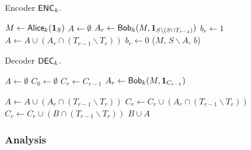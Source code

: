 \begin{algorithm}[H] 
  \caption{Encoder $\textsf{ENC}_k$.} \label{algo:enc4}
  \begin{algorithmic}[1]
    \State $M \leftarrow \mathsf{Alice}_k(\mathbf{1}_S)$
    \State $A\leftarrow \emptyset$
    \State $A_r\leftarrow \mathsf{Bob}_k(M, \mathbf{1}_{S\backslash (S\cap T_{r-1})})$
     
      \State $b_r\leftarrow 1$ 
      \State $A\leftarrow A \cup (A_r\cap (T_{r-1}\backslash T_r))$
    \Else 
      \State $b_r\leftarrow 0$
    \EndIf
    \EndFor
      \State \Return ($M$, $S\backslash A$, $b$) 
    \EndProcedure
  \end{algorithmic}
\end{algorithm}

\begin{algorithm}[H] 
  \caption{Decoder $\textsf{DEC}_k$.} \label{algo:dec4}
  \begin{algorithmic}[1]
    \State $A\leftarrow \emptyset$
    \State $C_0 \leftarrow \emptyset$
      \State $C_r\leftarrow C_{r-1}$
        \State $A_r\leftarrow \mathsf{Bob}_k(M, \mathbf{1}_{C_{r-1}})$ \begin{flushright}\end{flushright}
        \State $A\leftarrow A \cup (A_r\cap (T_{r-1}\backslash T_r))$
        \State $C_r\leftarrow C_r \cup (A_r\cap (T_{r-1}\backslash T_r))$
      \EndIf
      \State $C_r\leftarrow C_r \cup (B\cap (T_{r-1}\backslash T_r))$
    \EndFor
    \State \Return $B\cup A$ 
    \EndProcedure
  \end{algorithmic}
\end{algorithm}

\subsubsection{Analysis}


